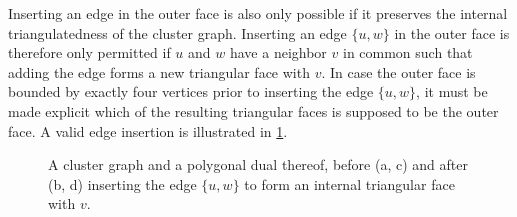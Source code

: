 Inserting an edge in the outer face is also only possible if it preserves the internal triangulatedness of the cluster graph. Inserting an edge $\{u,w\}$ in the outer face is therefore only permitted if $u$ and $w$ have a neighbor $v$ in common such that adding the edge forms a new triangular face with $v$. In case the outer face is bounded by exactly four vertices prior to inserting the edge $\{u,w\}$, it must be made explicit which of the resulting triangular faces is supposed to be the outer face. A valid edge insertion is illustrated in \cref{fig:flip-edge-example-insert}.

\begin{figure}[H]
	\centering
	\quad
	\qquad
	\quad
	\caption{A cluster graph and a polygonal dual thereof, before (a, c) and after (b, d) inserting the edge $\{u,w\}$ to form an internal triangular face with $v$.}
	\label{fig:flip-edge-example-insert}
\end{figure}

